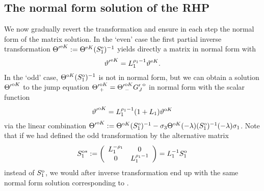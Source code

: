 \documentclass[12pt]{iopart}
\begin{document}
\subsection{The normal form solution of the RHP}

We now gradually revert the transformation  and ensure in each step the normal form of the matrix solution.
In the `even' case the first partial inverse transformation ${\Theta'}^{{\rm e}K}:=\Theta^{{\rm e}K}(S_1^{\rm e})^{-1}$ yields directly a matrix in normal form with 
\begin{equation}
{\vartheta'}^{{\rm e}K}=L_1^{\rho_1-1}\vartheta^{{\rm e}K}. \label{S1eRücktrafo}
\end{equation}
In the `odd' case, $\Theta^{{\rm o}K}(S_1^{\rm o})^{-1}$ is not in normal form, but we can obtain a solution ${\Theta'}^{{\rm o}K}$ to the jump equation ${\Theta'}_+^{{\rm o}K}={\Theta'}_-^{{\rm o}K}{G'_J}^{\rm o}$ in normal form with the scalar function 
\begin{equation}
{\vartheta'}^{{\rm o}K}=L_1^{\rho_1-1}(1+L_1)\vartheta^{{\rm o}K} \label{S1oRücktrafo}
\end{equation}
via the linear combination ${\Theta'}^{{\rm o}K}:=\Theta^{{\rm o}K}(S_1^{\rm o})^{-1}-\sigma_3\Theta^{{\rm o}K}(-\lambda)(S_1^{\rm o})^{-1}(-\lambda)\sigma_1$. 
Note that if we had defined the odd transformation by the alternative matrix
\begin{eqnarray}
S_{1}^{\rm o\ast}:=\left(\begin{array}{cc}
L_1^{-\rho_1} & 0 \\
0 & L_1^{\rho_1-1} 
\end{array}\right)=L_1^{-1} S_{1}^{\rm o}
\end{eqnarray}
instead of $S_{1}^{\rm o}$, we would after inverse transformation end up with the same normal form solution corresponding to . 
\end{document}
